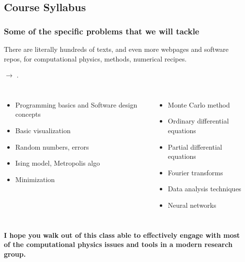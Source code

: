 \documentclass[hyperref={colorlinks=true}]{beamer}
\begin{document}
\subsection[Course Syllabus]{Course Syllabus}

\begin{frame}%
  \frametitle{Some of the specific problems that we will tackle}

  There are literally hundreds of texts, and even more webpages and software repos, for computational physics, methods, numerical recipes. 
  
  $\rightarrow$ .

  \begin{columns}
   
    
      \begin{itemize}
        \item Programming basics and Software design concepts
        \item Basic visualization
        \item Random numbers, errors
        \item Ising model, Metropolis algo
        \item Minimization 
      \end{itemize}
    
  
      \begin{itemize}
        \item Monte Carlo method
        \item Ordinary differential equations
        \item Partial differential equations
        \item Fourier transforms
        \item Data analysis techniques
        \item Neural networks
      \end{itemize}
  
  \end{columns}
  
  \vspace{0.5cm}
  
  \centering \textbf{I hope you walk out of this class able to effectively engage with most of the computational physics issues and tools in a modern research group.}
  
\end{frame}
\end{document}
